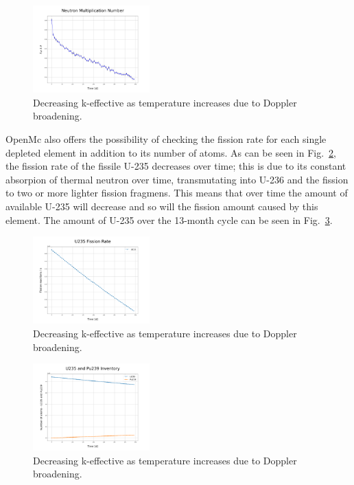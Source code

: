 \documentclass[twocolumn,a4paper,10pt]{article}
\begin{document}
\begin{figure}[t]
  \centering
  \includegraphics[width=0.4\textwidth]{../Pictures/Depletion_keff.png}
  \caption{Decreasing k-effective as temperature increases due to Doppler broadening.}
  \label{fig:Depletionkeff}
\end{figure}

\par
OpenMc also offers the possibility of checking the fission rate for each single depleted element in addition to its number of atoms. As can be seen in Fig.~\ref{fig:fissionU235}, the fission rate of the fissile U-235 decreases over time; this is due to its constant absorpion of thermal neutron over time, transmutating into U-236 and the fission to two or more lighter fission fragmens. This means that over time the amount of available U-235 will decrease and so will the fission amount caused by this element. The amount of U-235 over the 13-month cycle can be seen in Fig.~\ref{fig:U235vsPu239}.  

\begin{figure}[ht]
  \centering
  \includegraphics[width=0.4\textwidth]{../Pictures/Depletion_FissionU235.png}
  \caption{Decreasing k-effective as temperature increases due to Doppler broadening.}
  \label{fig:fissionU235}
\end{figure}

\begin{figure}[ht]
  \centering
  \includegraphics[width=0.4\textwidth]{../Pictures/Depletion_U235_P239.png}
  \caption{Decreasing k-effective as temperature increases due to Doppler broadening.}
  \label{fig:U235vsPu239}
\end{figure}
\end{document}
